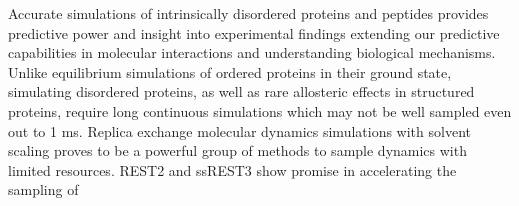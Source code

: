 Accurate simulations of intrinsically disordered proteins and peptides provides predictive power and insight into experimental findings extending our predictive capabilities in molecular interactions and understanding biological mechanisms. Unlike equilibrium simulations of ordered proteins in their ground state, simulating disordered proteins, as well as rare allosteric effects in structured proteins, require long continuous simulations which may not be well sampled even out to 1 ms. Replica exchange molecular dynamics simulations with solvent scaling proves to be a powerful group of methods to sample dynamics with limited resources. REST2 and ssREST3 show promise in accelerating the sampling of